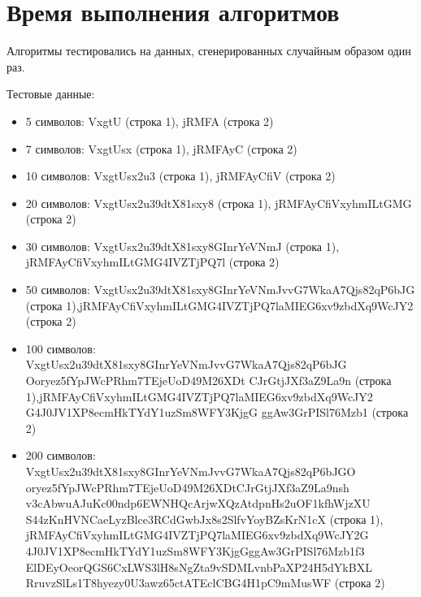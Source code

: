 \documentclass[12pt]{report}
\begin{document}
\section{Время выполнения алгоритмов}
Алгоритмы тестировались на данных, сгенерированных случайным образом один раз.

Тестовые данные:
\begin{itemize}
\item 5 символов:\newline
VxgtU (строка 1),\newline
jRMFA (строка 2)
\item 7 символов:\newline
VxgtUsx (строка 1),\newline
jRMFAyC (строка 2)
\item 10 символов:\newline
VxgtUsx2u3 (строка 1),\newline
jRMFAyCfiV (строка 2)
\item 20 символов:\newline
VxgtUsx2u39dtX81sxy8 (строка 1),\newline
jRMFAyCfiVxyhmILtGMG (строка 2)
\item 30 символов:\newline
VxgtUsx2u39dtX81sxy8GInrYeVNmJ (строка 1),\newline
jRMFAyCfiVxyhmILtGMG4IVZTjPQ7l (строка 2)
\item 50 символов:\newline
VxgtUsx2u39dtX81sxy8GInrYeVNmJvvG7WkaA7Qjs82qP6bJG (строка 1),\newline jRMFAyCfiVxyhmILtGMG4IVZTjPQ7laMIEG6xv9zbdXq9WcJY2 (строка 2)
\item 100 символов:\newline
VxgtUsx2u39dtX81sxy8GInrYeVNmJvvG7WkaA7Qjs82qP6bJG\newline
Ooryez5fYpJWcPRhm7TEjeUoD49M26XDt CJrGtjJXf3aZ9La9n (строка 1),\newline jRMFAyCfiVxyhmILtGMG4IVZTjPQ7laMIEG6xv9zbdXq9WcJY2\newline
G4J0JV1XP8ecmHkTYdY1uzSm8WFY3KjgG ggAw3GrPISl76Mzb1 (строка 2)
\item 200 символов:\newline
VxgtUsx2u39dtX81sxy8GInrYeVNmJvvG7WkaA7Qjs82qP6bJGO\newline
oryez5fYpJWcPRhm7TEjeUoD49M26XDtCJrGtjJXf3aZ9La9nsh\newline
v3cAbwuAJuKc00ndp6EWNHQcArjwXQzAtdpnHs2uOF1kfhWjzXU\newline
S44zKnHVNCaeLyzBlce3RCdGwbJx8s2SlfvYoyBZsKrN1cX (строка 1),\newline
jRMFAyCfiVxyhmILtGMG4IVZTjPQ7laMIEG6xv9zbdXq9WcJY2G\newline
4J0JV1XP8ecmHkTYdY1uzSm8WFY3KjgGggAw3GrPISl76Mzb1f3\newline
ElDEyOeorQGS6CxLWS3lH8sNgZta9vSDMLvnbPaXP24H5dYkBXL\newline
RruvzSlLs1T8hyezy0U3awz65ctATEclCBG4H1pC9mMusWF (строка 2)
\end{itemize}
\end{document}
